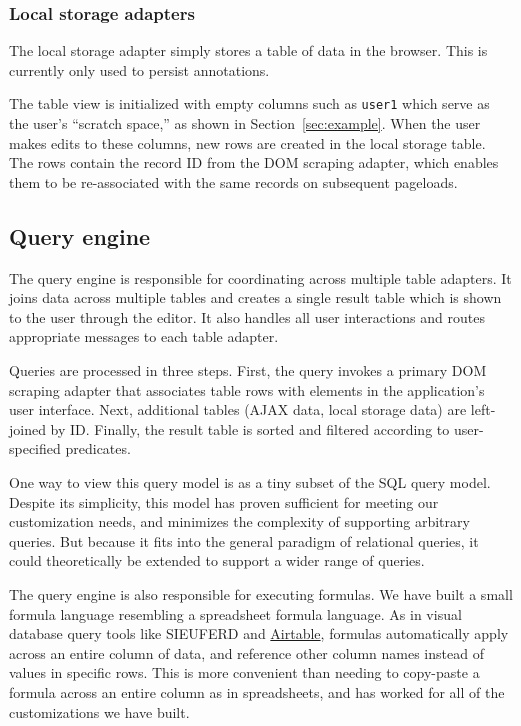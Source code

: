 \documentclass[sigplan,screen,10pt,anonymous,review]{acmart}
\begin{document}
\hypertarget{local-storage-adapters}{%
\subsubsection{Local storage adapters}\label{local-storage-adapters}}

The local storage adapter simply stores a table of data in the browser.
This is currently only used to persist annotations.

The table view is initialized with empty columns such as \texttt{user1}
which serve as the user's ``scratch space,'' as shown in
Section~\ref{sec:example}. When the user makes edits to these columns,
new rows are created in the local storage table. The rows contain the
record ID from the DOM scraping adapter, which enables them to be
re-associated with the same records on subsequent pageloads.

\hypertarget{query-engine}{%
\subsection{Query engine}\label{query-engine}}

The query engine is responsible for coordinating across multiple table
adapters. It joins data across multiple tables and creates a single
result table which is shown to the user through the editor. It also
handles all user interactions and routes appropriate messages to each
table adapter.

Queries are processed in three steps. First, the query invokes a primary
DOM scraping adapter that associates table rows with elements in the
application's user interface. Next, additional tables (AJAX data, local
storage data) are left-joined by ID. Finally, the result table is sorted
and filtered according to user-specified predicates.

One way to view this query model is as a tiny subset of the SQL query
model. Despite its simplicity, this model has proven sufficient for
meeting our customization needs, and minimizes the complexity of
supporting arbitrary queries. But because it fits into the general
paradigm of relational queries, it could theoretically be extended to
support a wider range of queries.

The query engine is also responsible for executing formulas. We have
built a small formula language resembling a spreadsheet formula
language. As in visual database query tools like SIEUFERD
\citep{bakke2016} and \href{https://airtable.com/}{Airtable}, formulas
automatically apply across an entire column of data, and reference other
column names instead of values in specific rows. This is more convenient
than needing to copy-paste a formula across an entire column as in
spreadsheets, and has worked for all of the customizations we have
built.
\end{document}
